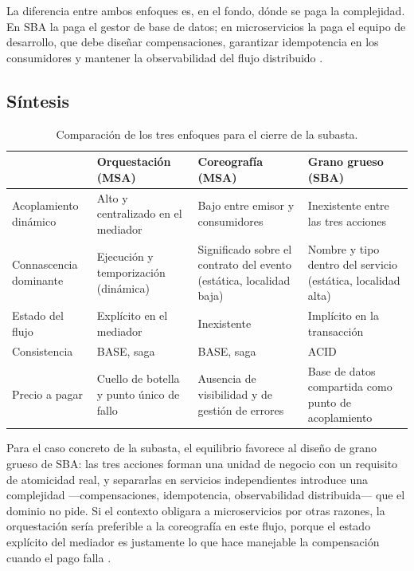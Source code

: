 La diferencia entre ambos enfoques es, en el fondo, dónde se paga la complejidad. En SBA la paga el gestor de base de datos; en microservicios la paga el equipo de desarrollo, que debe diseñar compensaciones, garantizar idempotencia en los consumidores y mantener la observabilidad del flujo distribuido \parencite{fordhardparts2021}.

\subsection{Síntesis}

\begin{table}[h]
\centering
\small
\begin{tabularx}{\textwidth}{L{2.6cm}XXX}
\toprule
 & \textbf{Orquestación (MSA)} & \textbf{Coreografía (MSA)} & \textbf{Grano grueso (SBA)} \\
\midrule
Acoplamiento dinámico & Alto y centralizado en el mediador & Bajo entre emisor y consumidores & Inexistente entre las tres acciones \\
Connascencia dominante & Ejecución y temporización (dinámica) & Significado sobre el contrato del evento (estática, localidad baja) & Nombre y tipo dentro del servicio (estática, localidad alta) \\
Estado del flujo & Explícito en el mediador & Inexistente & Implícito en la transacción \\
Consistencia & BASE, saga & BASE, saga & ACID \\
Precio a pagar & Cuello de botella y punto único de fallo & Ausencia de visibilidad y de gestión de errores & Base de datos compartida como punto de acoplamiento \\
\bottomrule
\end{tabularx}
\caption{Comparación de los tres enfoques para el cierre de la subasta.}
\end{table}

Para el caso concreto de la subasta, el equilibrio favorece al diseño de grano grueso de SBA: las tres acciones forman una unidad de negocio con un requisito de atomicidad real, y separarlas en servicios independientes introduce una complejidad ---compensaciones, idempotencia, observabilidad distribuida--- que el dominio no pide. Si el contexto obligara a microservicios por otras razones, la orquestación sería preferible a la coreografía en este flujo, porque el estado explícito del mediador es justamente lo que hace manejable la compensación cuando el pago falla \parencite{fordhardparts2021}.
